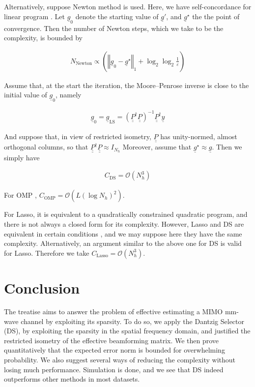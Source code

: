 \documentclass[journal]{IEEEtran}
\newcommand {\e} {\varepsilon}
\newcommand {\m} [1] {\( #1 \)}
\newcommand {\V} [1] {\underline {#1}}
\newcommand {\M} [1] {\underline {\underline {#1}}}
\newcommand {\RB} [1] {\left( #1 \right)}
\newcommand {\VNm} [1] {\left \Vert #1 \right \Vert}
\newcommand {\Disp} [1] {
   \begin {align*}
      #1
   \end {align*}
}
\begin{document}
Alternatively, suppose Newton method is used.
Here, we have self-concordance for linear program \cite {BoV04}.
Let \m {\V {g} _0} denote the starting value of \m {\V {g}'}, and \m {\V {g} ^{\star}} the the point of convergence.
Then the number of Newton steps, which we take to be the complexity, is bounded by \cite {BoV04}
\Disp {
N_{\mathrm {Newton}}
\propto \RB {\VNm {\V {g}_0 -\V {g} ^{\star}}_1
+ \log_2 \log_2 \frac {1} {\e}}
}

Assume that, at the start the iteration, the Moore–Penrose inverse is close to the initial value of \m {\V {g}_0}, namely
%
\Disp {
\V {g}_0
=\V {g}_{\mathrm {LS}}
= \RB {\M {P} ^\dagger \M {P}} ^{-1} \M {P} ^\dagger \V {y} 
}
And suppose that, in view of restricted isometry, \m {\M {P}} has unity-normed, almost orthogonal columns, so that
\m {\M {P} ^\dagger \M {P} \approx I _{N_h}}
Moreover, assume that \m {\V {g} ^\star \approx \V {g}}.
Then we simply have
\Disp {
C_{\mathrm {DS}}
=\mathcal {O} \RB {N_h ^3} 
}

For OMP \cite {TrG07}, \m {C_{\mathrm {OMP}} =\mathcal {O} \RB {L \RB {\log N_h} ^2}}.

For Lasso, it is equivalent to a quadratically constrained quadratic program, and there is not always a closed form for its complexity.
However, Lasso and DS are equivalent in certain conditions \cite {AsR10}, and we may suppose here they have the same complexity.
Alternatively, an argument similar to the above one for DS is valid for Lasso.
Therefore we take \m {C_{\mathrm {Lasso}} =\mathcal {O} \RB {N_h ^3}}.



\section{Conclusion}

The treatise aims to answer the problem of effective estimating a MIMO mm-wave channel by exploiting its sparsity.
To do so, we apply the Dantzig Selector (DS), by exploiting the sparsity in the spatial frequency domain, and justified the restricted isometry of the effective beamforming matrix.
We then prove quantitatively that the expected error norm is bounded for overwhelming probability.
We also suggest several ways of reducing the complexity without losing much performance.
Simulation is done, and we see that DS indeed outperforms other methods in most datasets.
\end{document}
